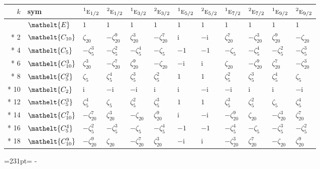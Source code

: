 \documentclass[10pt,a4paper]{article}
\newcommand{\needspace}[1]{\par\penalty-100\begingroup\dimen0=#1\relax\dimen2=\pagegoal
  \advance\dimen2-\pagetotal\ifdim\dimen0>\dimen2\relax\ifdim\dimen2>0pt\vfil\break\fi\fi
  \endgroup}
\numberwithin{equation}{section}
\newcommand{\eltfont}[1]{{\let\sigma\eltsigma\mathelt{#1}}}
\newcommand{\irr}[1]{\text{\normalfont\scshape #1}}
\newcommand{\conjpair}[1]{{}^{#1}}
\newcommand{\cls}[1]{\eltfont{#1}}
\newcommand{\iunit}{\mathrm{i}}
\newcommand{\rootunity}[1]{\zeta_{#1}}
\begin{document}
{\small\setlength{\tabcolsep}{4pt}
\begin{longtable}{@{}rlllllllllll@{}}\toprule
$k$ & sym & $\conjpair{1}\irr{e}_{1/2}$ & $\conjpair{2}\irr{e}_{1/2}$ & $\conjpair{1}\irr{e}_{3/2}$ & $\conjpair{2}\irr{e}_{3/2}$ & $\conjpair{1}\irr{e}_{5/2}$ & $\conjpair{2}\irr{e}_{5/2}$ & $\conjpair{1}\irr{e}_{7/2}$ & $\conjpair{2}\irr{e}_{7/2}$ & $\conjpair{1}\irr{e}_{9/2}$ & $\conjpair{2}\irr{e}_{9/2}$\\\midrule\endhead
\bottomrule\endfoot\endlastfoot
0 & $\cls{E}$ & $1$ & $1$ & $1$ & $1$ & $1$ & $1$ & $1$ & $1$ & $1$ & $1$\\*
2 & $\cls{C_{10}}$ & $\rootunity{20}$ & $-\rootunity{20}^{9}$ & $\rootunity{20}^{3}$ & $-\rootunity{20}^{7}$ & $\iunit{}$ & $-\iunit{}$ & $\rootunity{20}^{7}$ & $-\rootunity{20}^{3}$ & $\rootunity{20}^{9}$ & $-\rootunity{20}$\\*
4 & $\cls{C_{5}}$ & $-\rootunity{5}^{3}$ & $-\rootunity{5}^{2}$ & $-\rootunity{5}^{4}$ & $-\rootunity{5}$ & $-1$ & $-1$ & $-\rootunity{5}$ & $-\rootunity{5}^{4}$ & $-\rootunity{5}^{2}$ & $-\rootunity{5}^{3}$\\*
6 & $\cls{C_{10}^{3}}$ & $\rootunity{20}^{3}$ & $-\rootunity{20}^{7}$ & $\rootunity{20}^{9}$ & $-\rootunity{20}$ & $-\iunit{}$ & $\iunit{}$ & $\rootunity{20}$ & $-\rootunity{20}^{9}$ & $\rootunity{20}^{7}$ & $-\rootunity{20}^{3}$\\*
8 & $\cls{C_{5}^{2}}$ & $\rootunity{5}$ & $\rootunity{5}^{4}$ & $\rootunity{5}^{3}$ & $\rootunity{5}^{2}$ & $1$ & $1$ & $\rootunity{5}^{2}$ & $\rootunity{5}^{3}$ & $\rootunity{5}^{4}$ & $\rootunity{5}$\\*
10 & $\cls{C_{2}}$ & $\iunit{}$ & $-\iunit{}$ & $-\iunit{}$ & $\iunit{}$ & $\iunit{}$ & $-\iunit{}$ & $-\iunit{}$ & $\iunit{}$ & $\iunit{}$ & $-\iunit{}$\\*
12 & $\cls{C_{5}^{3}}$ & $\rootunity{5}^{4}$ & $\rootunity{5}$ & $\rootunity{5}^{2}$ & $\rootunity{5}^{3}$ & $1$ & $1$ & $\rootunity{5}^{3}$ & $\rootunity{5}^{2}$ & $\rootunity{5}$ & $\rootunity{5}^{4}$\\*
14 & $\cls{C_{10}^{7}}$ & $-\rootunity{20}^{7}$ & $\rootunity{20}^{3}$ & $-\rootunity{20}$ & $\rootunity{20}^{9}$ & $\iunit{}$ & $-\iunit{}$ & $-\rootunity{20}^{9}$ & $\rootunity{20}$ & $-\rootunity{20}^{3}$ & $\rootunity{20}^{7}$\\*
16 & $\cls{C_{5}^{4}}$ & $-\rootunity{5}^{2}$ & $-\rootunity{5}^{3}$ & $-\rootunity{5}$ & $-\rootunity{5}^{4}$ & $-1$ & $-1$ & $-\rootunity{5}^{4}$ & $-\rootunity{5}$ & $-\rootunity{5}^{3}$ & $-\rootunity{5}^{2}$\\*
18 & $\cls{C_{10}^{9}}$ & $-\rootunity{20}^{9}$ & $\rootunity{20}$ & $-\rootunity{20}^{7}$ & $\rootunity{20}^{3}$ & $-\iunit{}$ & $\iunit{}$ & $-\rootunity{20}^{3}$ & $\rootunity{20}^{7}$ & $-\rootunity{20}$ & $\rootunity{20}^{9}$\\
\bottomrule\end{longtable}}
\needspace{231pt}
\end{document}
